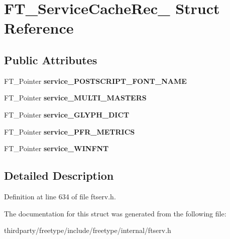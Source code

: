 \hypertarget{struct_f_t___service_cache_rec__}{}\section{F\+T\+\_\+\+Service\+Cache\+Rec\+\_\+ Struct Reference}
\label{struct_f_t___service_cache_rec__}
\subsection*{Public Attributes}
\begin{DoxyCompactItemize}
\item 
\mbox{\label{struct_f_t___service_cache_rec___a1b95ee574621c8b031fe239d449bfa5c}} 
F\+T\+\_\+\+Pointer {\bfseries service\+\_\+\+P\+O\+S\+T\+S\+C\+R\+I\+P\+T\+\_\+\+F\+O\+N\+T\+\_\+\+N\+A\+ME}
\item 
\mbox{\label{struct_f_t___service_cache_rec___abf51ac75b59eeac29ad5e4bbbc50e749}} 
F\+T\+\_\+\+Pointer {\bfseries service\+\_\+\+M\+U\+L\+T\+I\+\_\+\+M\+A\+S\+T\+E\+RS}
\item 
\mbox{\label{struct_f_t___service_cache_rec___af8bbf442f497ad21666069ec33aaa88a}} 
F\+T\+\_\+\+Pointer {\bfseries service\+\_\+\+G\+L\+Y\+P\+H\+\_\+\+D\+I\+CT}
\item 
\mbox{\label{struct_f_t___service_cache_rec___ac5d029d7f442e8b727c40d5a88faa344}} 
F\+T\+\_\+\+Pointer {\bfseries service\+\_\+\+P\+F\+R\+\_\+\+M\+E\+T\+R\+I\+CS}
\item 
\mbox{\label{struct_f_t___service_cache_rec___abb824452cfb20932fbd22405323781f9}} 
F\+T\+\_\+\+Pointer {\bfseries service\+\_\+\+W\+I\+N\+F\+NT}
\end{DoxyCompactItemize}


\subsection{Detailed Description}


Definition at line 634 of file ftserv.\+h.



The documentation for this struct was generated from the following file\+:\begin{DoxyCompactItemize}
\item 
thirdparty/freetype/include/freetype/internal/ftserv.\+h\end{DoxyCompactItemize}
